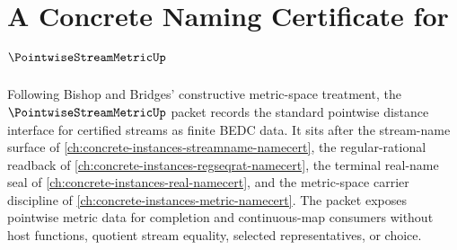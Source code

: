 \chapter{A Concrete Naming Certificate for $\PointwiseStreamMetricUp$}
\label{ch:concrete-instances-pointwise-stream-metric-namecert}

Following Bishop and Bridges' constructive metric-space treatment, the $\PointwiseStreamMetricUp$ packet records the standard pointwise distance interface for certified streams as finite BEDC data. It sits after the stream-name surface of \autoref{ch:concrete-instances-streamname-namecert}, the regular-rational readback of \autoref{ch:concrete-instances-regseqrat-namecert}, the terminal real-name seal of \autoref{ch:concrete-instances-real-namecert}, and the metric-space carrier discipline of \autoref{ch:concrete-instances-metric-namecert}. The packet exposes pointwise metric data for completion and continuous-map consumers without host functions, quotient stream equality, selected representatives, or choice.

